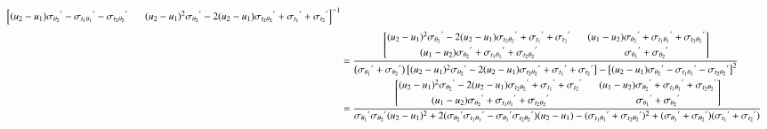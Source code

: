 \documentclass{article}
\begin{document}
\begin{align*}
\begin{bmatrix}
                (u_2-u_1){\sigma_{\theta_2}}^{'} - {\sigma_{t_1\theta_1}}^{'} - {\sigma_{t_2\theta_2}}^{'}
                &\,\,\,\, (u_2-u_1)^2{\sigma_{\theta_2}}^{'}-2(u_2-u_1){\sigma_{t_2\theta_2}}^{'} + {\sigma_{t_1}}^{'} + {\sigma_{t_2}}^{'}
            \end{bmatrix}^{-1}
            \\[0.3em]
            &=
            \cfrac
            {
            \begin{bmatrix}
                 (u_2-u_1)^2{\sigma_{\theta_2}}^{'}-2(u_2-u_1){\sigma_{t_2\theta_2}}^{'} + {\sigma_{t_1}}^{'} + {\sigma_{t_2}}^{'}
                 &\,\,\,\,  (u_1-u_2){\sigma_{\theta_2}}^{'} +{\sigma_{t_1\theta_1}}^{'} +{\sigma_{t_2\theta_2}}^{'}\\[0.3em]
                (u_1-u_2){\sigma_{\theta_2}}^{'} + {\sigma_{t_1\theta_1}}^{'} + {\sigma_{t_2\theta_2}}^{'}
                &\,\,\,\, {\sigma_{\theta_1}}^{'} + {\sigma_{\theta_2}}^{'}
            \end{bmatrix}
            }
            {
            \left(
            {\sigma_{\theta_1}}^{'} + {\sigma_{\theta_2}}^{'}
            \right)
            \left[
            (u_2-u_1)^2{\sigma_{\theta_2}}^{'}-2(u_2-u_1){\sigma_{t_2\theta_2}}^{'} + {\sigma_{t_1}}^{'} + {\sigma_{t_2}}^{'}
            \right]
            -
            \left[
            (u_2-u_1){\sigma_{\theta_2}}^{'} - {\sigma_{t_1\theta_1}}^{'} - {\sigma_{t_2\theta_2}}^{'}
            \right]^2
            }
            \\
            &=
            \cfrac
            {
            \begin{bmatrix}
                 (u_2-u_1)^2{\sigma_{\theta_2}}^{'}-2(u_2-u_1){\sigma_{t_2\theta_2}}^{'} + {\sigma_{t_1}}^{'} + {\sigma_{t_2}}^{'}
                 &\,\,\,\,  (u_1-u_2){\sigma_{\theta_2}}^{'} +{\sigma_{t_1\theta_1}}^{'} +{\sigma_{t_2\theta_2}}^{'}\\[0.3em]
                (u_1-u_2){\sigma_{\theta_2}}^{'} + {\sigma_{t_1\theta_1}}^{'} + {\sigma_{t_2\theta_2}}^{'}
                &\,\,\,\, {\sigma_{\theta_1}}^{'} + {\sigma_{\theta_2}}^{'}
            \end{bmatrix}
            }
            {
            {\sigma_{\theta_1}}^{'}{\sigma_{\theta_2}}^{'}(u_2-u_1)^2
            + 2( {\sigma_{\theta_2}}^{'}{\sigma_{t_1\theta_1}}^{'} - {\sigma_{\theta_1}}^{'}{\sigma_{t_2\theta_2}}^{'})(u_2-u_1)
            - ({\sigma_{t_1\theta_1}}^{'}+{\sigma_{t_2\theta_2}}^{'})^2
            + ({\sigma_{\theta_1}}^{'}+{\sigma_{\theta_2}}^{'})({\sigma_{t_1}}^{'}+{\sigma_{t_2}}^{'})
            }
        \end{align*}
\end{document}
